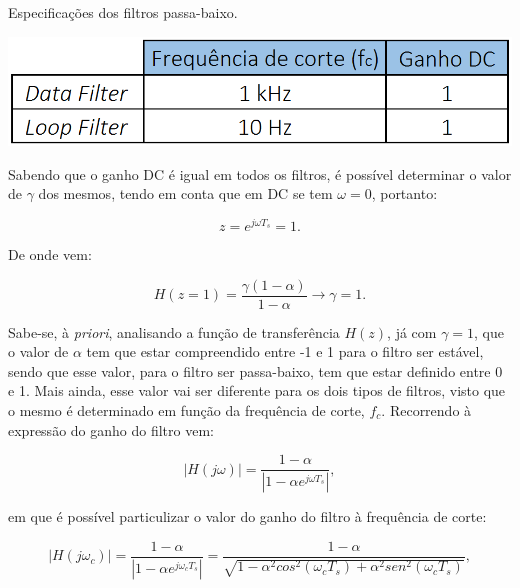 \documentclass[11pt]{article}
\numberwithin{equation}{section}
\begin{document}
{\begin{table}[H]
 	\centering
 	\caption{Especificações dos filtros passa-baixo.}
 	\vspace{-1.5mm}
 	\includegraphics[keepaspectratio=true, scale=0.35]{tabelas/especificacoes}
\end{table}

Sabendo que o ganho DC é igual em todos os filtros, é possível determinar o valor de $\gamma$ dos mesmos, tendo em conta que em DC se tem $\omega = 0$, portanto:

\vspace{-3mm}
\begin{equation}
	z = e^{j \omega T_s} = 1.
\end{equation}

\vspace{1mm}
De onde vem:

\vspace{-3mm}
\begin{equation}
	H(z = 1) = \frac{\gamma(1-\alpha)}{1-\alpha} \longrightarrow \gamma = 1.
\end{equation} 

\vspace{1mm}
Sabe-se, à \textit{priori}, analisando a função de transferência $H(z)$, já com $\gamma = 1$, que o valor de $\alpha$ tem que estar compreendido entre -1 e 1 para o filtro ser estável, sendo que esse valor, para o filtro ser passa-baixo, tem que estar definido entre 0 e 1. Mais ainda, esse valor vai ser diferente para os dois tipos de filtros, visto que o mesmo é determinado em função da frequência de corte, \textit{$f_c$}. Recorrendo à expressão do ganho do filtro vem:

\vspace{-3mm}
\begin{equation}
	|H(j\omega)| = \frac{1-\alpha}{|1-\alpha e^{j\omega T_s}|},
\end{equation} 

\vspace{1mm}
em que é possível particulizar o valor do ganho do filtro à frequência de corte:

\vspace{-3mm}
\begin{equation}
	|H(j\omega_c)| = \frac{1-\alpha}{|1-\alpha e^{j\omega_c T_s}|} = \frac{1 - \alpha}{\sqrt{1- \alpha^2 cos^2{(\omega_c T_s)} + \alpha^2 sen^2{(\omega_c T_s)}}},
\end{equation} 

}
\end{document}
